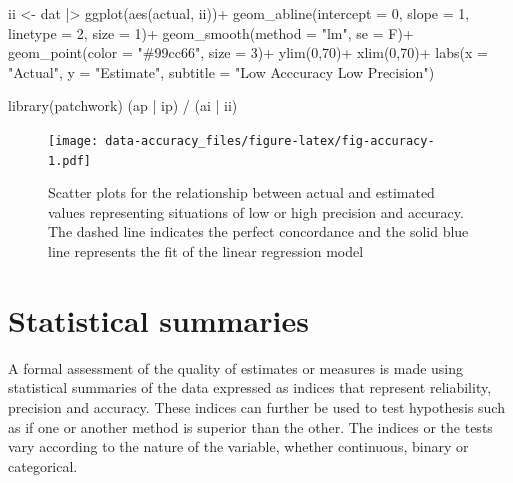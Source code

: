 \documentclass[
  letterpaper,
]{book}
\newenvironment{Shaded}{\begin{snugshade}}{\end{snugshade}}
\newcommand{\AttributeTok}[1]{\textcolor[rgb]{0.40,0.45,0.13}{#1}}
\newcommand{\DecValTok}[1]{\textcolor[rgb]{0.68,0.00,0.00}{#1}}
\newcommand{\FunctionTok}[1]{\textcolor[rgb]{0.28,0.35,0.67}{#1}}
\newcommand{\NormalTok}[1]{\textcolor[rgb]{0.00,0.23,0.31}{#1}}
\newcommand{\OtherTok}[1]{\textcolor[rgb]{0.00,0.23,0.31}{#1}}
\newcommand{\SpecialCharTok}[1]{\textcolor[rgb]{0.37,0.37,0.37}{#1}}
\newcommand{\StringTok}[1]{\textcolor[rgb]{0.13,0.47,0.30}{#1}}
\begin{document}
\begin{Shaded}
\begin{Highlighting}[]
\NormalTok{ii }\OtherTok{\textless{}{-}}\NormalTok{ dat }\SpecialCharTok{|\textgreater{}} 
  \FunctionTok{ggplot}\NormalTok{(}\FunctionTok{aes}\NormalTok{(actual, ii))}\SpecialCharTok{+}
  \FunctionTok{geom\_abline}\NormalTok{(}\AttributeTok{intercept =} \DecValTok{0}\NormalTok{, }\AttributeTok{slope =} \DecValTok{1}\NormalTok{, }
              \AttributeTok{linetype =} \DecValTok{2}\NormalTok{, }\AttributeTok{size =} \DecValTok{1}\NormalTok{)}\SpecialCharTok{+}
  \FunctionTok{geom\_smooth}\NormalTok{(}\AttributeTok{method =} \StringTok{"lm"}\NormalTok{, }\AttributeTok{se =}\NormalTok{ F)}\SpecialCharTok{+}
  \FunctionTok{geom\_point}\NormalTok{(}\AttributeTok{color =} \StringTok{"\#99cc66"}\NormalTok{, }\AttributeTok{size =} \DecValTok{3}\NormalTok{)}\SpecialCharTok{+}
  \FunctionTok{ylim}\NormalTok{(}\DecValTok{0}\NormalTok{,}\DecValTok{70}\NormalTok{)}\SpecialCharTok{+}
  \FunctionTok{xlim}\NormalTok{(}\DecValTok{0}\NormalTok{,}\DecValTok{70}\NormalTok{)}\SpecialCharTok{+}
  \FunctionTok{labs}\NormalTok{(}\AttributeTok{x =} \StringTok{"Actual"}\NormalTok{, }\AttributeTok{y =} \StringTok{"Estimate"}\NormalTok{,}
       \AttributeTok{subtitle =} \StringTok{"Low Acccuracy Low Precision"}\NormalTok{)}

\FunctionTok{library}\NormalTok{(patchwork)}
\NormalTok{(ap }\SpecialCharTok{|}\NormalTok{ ip) }\SpecialCharTok{/}\NormalTok{ (ai }\SpecialCharTok{|}\NormalTok{ ii)}
\end{Highlighting}
\end{Shaded}

\begin{figure}

{\centering \texttt{[image: data-accuracy\_files/figure-latex/fig-accuracy-1.pdf]}

}

\caption{\label{fig-accuracy}Scatter plots for the relationship between
actual and estimated values representing situations of low or high
precision and accuracy. The dashed line indicates the perfect
concordance and the solid blue line represents the fit of the linear
regression model}

\end{figure}

\hypertarget{statistical-summaries}{%
\section{Statistical summaries}\label{statistical-summaries}}

A formal assessment of the quality of estimates or measures is made
using statistical summaries of the data expressed as indices that
represent reliability, precision and accuracy. These indices can further
be used to test hypothesis such as if one or another method is superior
than the other. The indices or the tests vary according to the nature of
the variable, whether continuous, binary or categorical.
\end{document}
